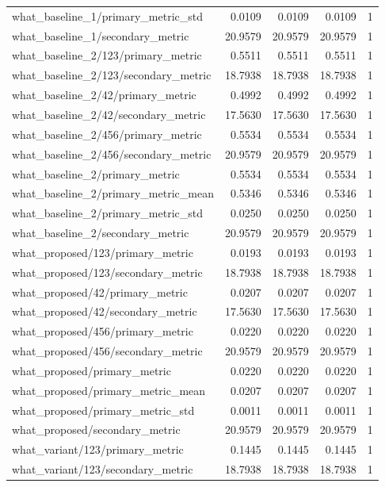 \begin{table}[h]
\begin{tabular}{lrrrr}
what_baseline_1/primary_metric_std & 0.0109 & 0.0109 & 0.0109 & 1 \\
what_baseline_1/secondary_metric & 20.9579 & 20.9579 & 20.9579 & 1 \\
what_baseline_2/123/primary_metric & 0.5511 & 0.5511 & 0.5511 & 1 \\
what_baseline_2/123/secondary_metric & 18.7938 & 18.7938 & 18.7938 & 1 \\
what_baseline_2/42/primary_metric & 0.4992 & 0.4992 & 0.4992 & 1 \\
what_baseline_2/42/secondary_metric & 17.5630 & 17.5630 & 17.5630 & 1 \\
what_baseline_2/456/primary_metric & 0.5534 & 0.5534 & 0.5534 & 1 \\
what_baseline_2/456/secondary_metric & 20.9579 & 20.9579 & 20.9579 & 1 \\
what_baseline_2/primary_metric & 0.5534 & 0.5534 & 0.5534 & 1 \\
what_baseline_2/primary_metric_mean & 0.5346 & 0.5346 & 0.5346 & 1 \\
what_baseline_2/primary_metric_std & 0.0250 & 0.0250 & 0.0250 & 1 \\
what_baseline_2/secondary_metric & 20.9579 & 20.9579 & 20.9579 & 1 \\
what_proposed/123/primary_metric & 0.0193 & 0.0193 & 0.0193 & 1 \\
what_proposed/123/secondary_metric & 18.7938 & 18.7938 & 18.7938 & 1 \\
what_proposed/42/primary_metric & 0.0207 & 0.0207 & 0.0207 & 1 \\
what_proposed/42/secondary_metric & 17.5630 & 17.5630 & 17.5630 & 1 \\
what_proposed/456/primary_metric & 0.0220 & 0.0220 & 0.0220 & 1 \\
what_proposed/456/secondary_metric & 20.9579 & 20.9579 & 20.9579 & 1 \\
what_proposed/primary_metric & 0.0220 & 0.0220 & 0.0220 & 1 \\
what_proposed/primary_metric_mean & 0.0207 & 0.0207 & 0.0207 & 1 \\
what_proposed/primary_metric_std & 0.0011 & 0.0011 & 0.0011 & 1 \\
what_proposed/secondary_metric & 20.9579 & 20.9579 & 20.9579 & 1 \\
what_variant/123/primary_metric & 0.1445 & 0.1445 & 0.1445 & 1 \\
what_variant/123/secondary_metric & 18.7938 & 18.7938 & 18.7938 & 1 \\

\end{tabular}
\end{table}
